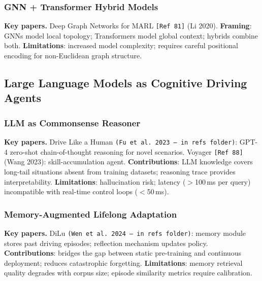 \documentclass[12pt, a4paper]{article}
\begin{document}
\subsubsection{GNN + Transformer Hybrid Models}

\begin{outline_note}
\textbf{Key papers.}
Deep Graph Networks for MARL \texttt{[Ref\,81]} (Li 2020).
\textbf{Framing}: GNNs model local topology; Transformers model
global context; hybrids combine both.
\textbf{Limitations}: increased model complexity; requires careful
positional encoding for non-Euclidean graph structure.
\end{outline_note}

\subsection{Large Language Models as Cognitive Driving Agents}

\subsubsection{LLM as Commonsense Reasoner}

\begin{outline_note}
\textbf{Key papers.}
Drive Like a Human \texttt{(Fu et al.\ 2023 -- in refs folder)}:
GPT-4 zero-shot chain-of-thought reasoning for novel scenarios.
Voyager \texttt{[Ref\,88]} (Wang 2023): skill-accumulation agent.
\textbf{Contributions}: LLM knowledge covers long-tail situations absent
from training datasets; reasoning trace provides interpretability.
\textbf{Limitations}: hallucination risk; latency ($>$100\,ms per query)
incompatible with real-time control loops ($<$50\,ms).
\end{outline_note}

\subsubsection{Memory-Augmented Lifelong Adaptation}

\begin{outline_note}
\textbf{Key papers.}
DiLu \texttt{(Wen et al.\ 2024 -- in refs folder)}: memory module
stores past driving episodes; reflection mechanism updates policy.
\textbf{Contributions}: bridges the gap between static pre-training
and continuous deployment; reduces catastrophic forgetting.
\textbf{Limitations}: memory retrieval quality degrades with corpus size;
episode similarity metrics require calibration.
\end{outline_note}
\end{document}
